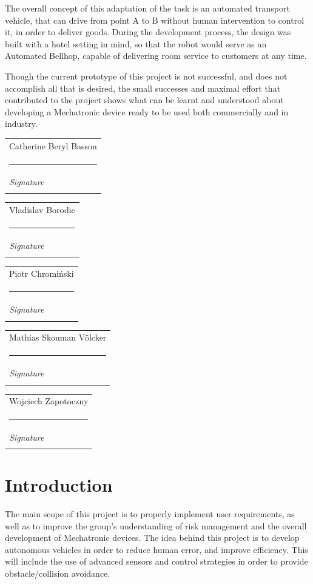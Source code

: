 \documentclass[11pt]{article}
\makeatletter
\newcommand{\namesigdate}[2][5cm]{%
	\begin{tabular}{@{}p{#1}@{}}
		#2 \\[2\normalbaselineskip] \hrule \\[0pt]
		{\small \textit{Signature}} \\[2\normalbaselineskip] \\[0pt]
	\end{tabular}
}
\makeatother
\begin{document}
The overall concept of this adaptation of the task is an automated transport vehicle, that can drive from point A to B without human intervention to control it, in order to deliver goods. During the development process, the design was built with a hotel setting in mind, so that the robot would serve as an Automated Bellhop, capable of delivering room service to customers at any time.

Though the current prototype of this project is not successful, and does not accomplish all that is desired, the small successes and maximal effort that contributed to the project shows what can be learnt and understood about developing a Mechatronic device ready to be used both commercially and in industry.
\newline
\newline
\newline

\noindent \namesigdate[6cm]{Catherine Beryl Basson} \hfill \namesigdate[6cm]{Vladislav Borodic}

\noindent \namesigdate[6cm]{Piotr Chromi\'nski} \hfill \namesigdate[6cm]{Mathias Skouman V\"olcker}


\noindent \namesigdate[6cm]{Wojciech Zapotoczny} \hfill
\newpage
\tableofcontents
{}
\lstset{style=customc}

\lstset{style=customc}
\newpage
{}
\section{Introduction}
The main scope of this project is to properly implement user requirements, as well as to improve the group’s understanding of risk management and the overall development of Mechatronic devices. The idea behind this project is to develop autonomous vehicles in order to reduce human error, and improve efficiency. This will include the use of advanced sensors and control strategies in order to provide obstacle/collision avoidance.
\end{document}
